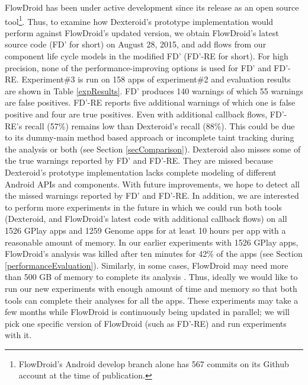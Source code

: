 \documentclass[10pt]{elsarticle}
\begin{document}
FlowDroid has been under active development since its release as an open source tool\footnote{FlowDroid's Android develop branch alone has 567 commits on its Github account at the time of publication.}. Thus, to examine how Dexteroid's prototype implementation would perform against FlowDroid's updated version, we obtain FlowDroid's latest source code (FD' for short) \cite{FDWiki} on August 28, 2015, and add flows from our component life cycle models in the modified FD' (FD'-RE for short). For high precision, none of the performance-improving options is used for FD' and FD'-RE. Experiment\#3 is run on 158 apps of experiment\#2 and evaluation results are shown in Table \ref{expResults}. FD' produces 140 warnings of which 55 warnings are false positives. FD'-RE reports five additional warnings of which one is false positive and four are true positives. Even with additional callback flows, FD'-RE's recall (57\%) remains low than Dexteroid's recall (88\%). This could be due to its dummy-main method based approach or incomplete taint tracking during the analysis or both (see Section \ref{secComparison}). Dexteroid also misses some of the true warnings reported by FD' and FD'-RE. They are missed because Dexteroid's prototype implementation lacks complete modeling of different Android APIs and components. With future improvements, we hope to detect all the missed warnings reported by FD' and FD'-RE. In addition, we are interested to perform more experiments in the future in which we could run both tools (Dexteroid, and FlowDroid's latest code with additional callback flows) on all 1526 GPlay apps and 1259 Genome apps for at least 10 hours per app with a reasonable amount of memory. In our earlier experiments with 1526 GPlay apps, FlowDroid's analysis was killed after ten minutes for 42\% of the apps (see Section \ref{performanceEvaluation}). Similarly, in some cases, FlowDroid may need more than 500 GB of memory to complete its analysis \cite{FDMailing}. Thus, ideally we would like to run our new experiments with enough amount of time and memory so that both tools can complete their analyses for all the apps. These experiments may take a few months while FlowDroid is continuously being updated in parallel; we will pick one specific version of FlowDroid (such as FD'-RE) and run experiments with it.
\end{document}

